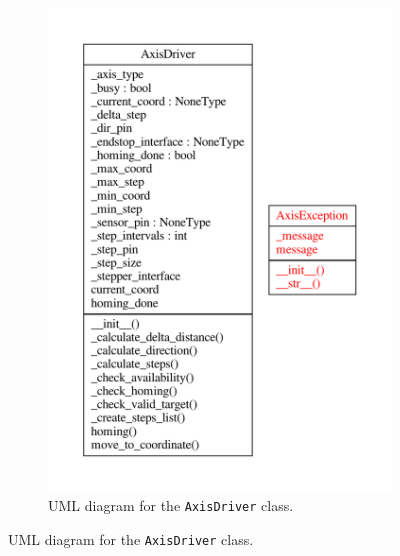 \documentclass{article}
\begin{document}
\begin{figure}[H]
    \ContinuedFloat
    \centering
    \begin{subfigure}{\textwidth}
        \centering
        \includegraphics{images/UML/axis_driver/axis_driver.pdf}
        \caption{UML diagram for the \texttt{AxisDriver} class.}
        \label{fig:axis_uml_driver}
    \end{subfigure}%
\end{figure}
\end{document}
